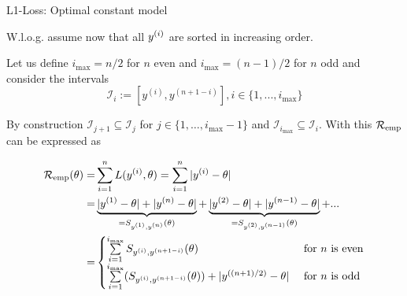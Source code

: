 \documentclass[11pt,compress,t,notes=noshow, xcolor=table]{beamer}
\begin{document}
\begin{frame}{L1-Loss: Optimal constant model}

W.l.o.g. assume now that all $\yi$ are sorted in increasing order.

Let us define $i_{\max} = n / 2$ for $n$ even and $i_{\max} = (n - 1) / 2$ for $n$ odd and consider the intervals 
$$
\mathcal{I}_i := [y^{(i)},y^{(n+1-i)}], i \in \{1, ..., i_{\max}\}
$$

By construction $\mathcal{I}_{j+1} \subseteq \mathcal{I}_j$ for $j \in \{1,\dots,i_{\max}-1\}$ and $\mathcal{I}_{i_{\max}} \subseteq \mathcal{I}_i$. With this $\riske$ can be expressed as
\begin{footnotesize}
\begin{align*}
\riske(\theta) =& \sumin L(\yi,\theta) = \sumin|\yi - \theta| \\ 
=& \underbrace{|\yi[1] - \theta| + |\yi[n] - \theta|}_{= S_{\yi[1], \yi[n]}(\theta)} + \underbrace{|\yi[2] - \theta| + |\yi[n - 1] - \theta|}_{= S_{\yi[2], \yi[n - 1]}(\theta)} + ...  \\
=& \begin{cases} \sum\limits_{i = 1}^{i_{\max}} S_{\yi, \yi[n + 1 - i]}(\theta) & \text{ for } n \text{ is even} \\
\sum\limits_{i = 1}^{i_{\max}} (S_{\yi, \yi[n + 1 - i]}(\theta)) + |\yi[(n + 1)/2] - \theta| & \text{ for } n \text{ is odd} \end{cases}
\end{align*}
\end{footnotesize}

\end{frame}
\end{document}
